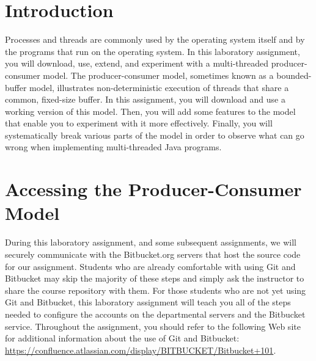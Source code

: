 

\usepackage[compact]{titlesec}



\section*{Introduction}

Processes and threads are commonly used by the operating system itself and by the programs that run on the operating system.  In
this laboratory assignment, you will download, use, extend, and experiment with a multi-threaded producer-consumer model.  The
producer-consumer model, sometimes known as a bounded-buffer model, illustrates non-deterministic execution of threads that
share a common, fixed-size buffer.  In this assignment, you will download and use a working version of this model.  Then, you will
add some features to the model that enable you to experiment with it more effectively.  Finally, you will systematically break
various parts of the model in order to observe what can go wrong when implementing multi-threaded Java programs.

\section*{Accessing the Producer-Consumer Model}

During this laboratory assignment, and some subsequent assignments, we will securely communicate with the Bitbucket.org servers
that host the source code for our assignment. Students who are already comfortable with using Git and Bitbucket may skip the
majority of these steps and simply ask the instructor to share the course repository with them.  For those students who are not
yet using Git and Bitbucket, this laboratory assignment will teach you all of the steps needed to configure the accounts on the
departmental servers and the Bitbucket service.  Throughout the assignment, you should refer to the following Web site for
additional information about the use of Git and Bitbucket: \url{https://confluence.atlassian.com/display/BITBUCKET/Bitbucket+101}.  

